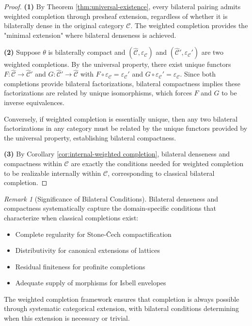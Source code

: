 \documentclass[11pt]{article}
\theoremstyle{plain}
\theoremstyle{definition}
\theoremstyle{remark}
\newtheorem{remark}[theorem]{Remark}
\newcommand{\C}{\mathcal{C}}
\newcommand{\wh}[1]{\widehat{#1}}
\begin{document}
\begin{proof}
\textbf{(1)} By Theorem \ref{thm:universal-existence}, every bilateral pairing admits weighted completion through presheaf extension, regardless of whether it is bilaterally dense in the original category $\C$. The weighted completion provides the "minimal extension" where bilateral denseness is achieved.

\textbf{(2)} Suppose $\theta$ is bilaterally compact and $(\wh{\C}, \varepsilon_\C)$ and $(\wh{\C}', \varepsilon_\C')$ are two weighted completions. By the universal property, there exist unique functors $F : \wh{\C} \to \wh{\C}'$ and $G : \wh{\C}' \to \wh{\C}$ with $F \circ \varepsilon_\C = \varepsilon_\C'$ and $G \circ \varepsilon_\C' = \varepsilon_\C$. Since both completions provide bilateral factorizations, bilateral compactness implies these factorizations are related by unique isomorphisms, which forces $F$ and $G$ to be inverse equivalences.

Conversely, if weighted completion is essentially unique, then any two bilateral factorizations in any category must be related by the unique functors provided by the universal property, establishing bilateral compactness.

\textbf{(3)} By Corollary \ref{cor:internal-weighted completion}, bilateral denseness and compactness within $\C$ are exactly the conditions needed for weighted completion to be realizable internally within $\C$, corresponding to classical bilateral completion.
\end{proof}

\begin{remark}[Significance of Bilateral Conditions]
Bilateral denseness and compactness systematically capture the domain-specific conditions that characterize when classical completions exist:
\begin{itemize}
\item Complete regularity for Stone-\v{C}ech compactification
\item Distributivity for canonical extensions of lattices  
\item Residual finiteness for profinite completions
\item Adequate supply of morphisms for Isbell envelopes
\end{itemize}
The weighted completion framework ensures that completion is always possible through systematic categorical extension, with bilateral conditions determining when this extension is necessary or trivial.
\end{remark}
\end{document}
